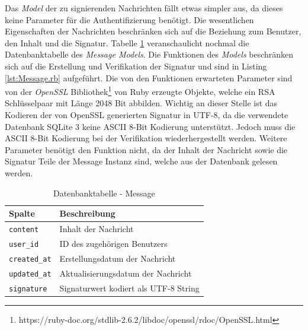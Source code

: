\documentclass[11pt,a4paper,ngerman]{scrreprt}
\begin{document}
Das \textit{Model} der zu signierenden Nachrichten fällt etwas simpler aus, da dieses keine Parameter für die Authentifizierung benötigt. Die wesentlichen Eigenschaften der Nachrichten beschränken sich auf die Beziehung zum Benutzer, den Inhalt und die Signatur. Tabelle \ref{table:db-message} veranschaulicht nochmal die Datenbanktabelle des \textit{Message Models}. Die Funktionen des \textit{Models} beschränken sich auf die Erstellung und Verifikation der Signatur und sind in Listing \ref{lst:Message.rb} aufgeführt. Die von den Funktionen erwarteten Parameter sind von der \textit{OpenSSL} Bibliothek\footnote{https://ruby-doc.org/stdlib-2.6.2/libdoc/openssl/rdoc/OpenSSL.html} von Ruby erzeugte Objekte, welche ein RSA Schlüsselpaar mit Länge 2048 Bit abbilden. Wichtig an dieser Stelle ist das Kodieren der von OpenSSL generierten Signatur in UTF-8, da die verwendete Datenbank SQLite 3 keine ASCII 8-Bit Kodierung unterstützt. Jedoch muss die ASCII 8-Bit Kodierung bei der Verifikation wiederhergestellt werden. Weitere Parameter benötigt den Funktion nicht, da der Inhalt der Nachricht sowie die Signatur Teile der Message Instanz sind, welche aus der Datenbank gelesen werden.
\begin{table}[htbp]
    \begin{tabularx}{\textwidth}{ lX }
        \toprule
        Spalte & Beschreibung \\ 
        \midrule
        \texttt{content} & Inhalt der Nachricht \\
        \texttt{user\_id} & ID des zugehörigen Benutzers \\
        \texttt{created\_at} & Erstellungsdatum der Nachricht \\
        \texttt{updated\_at} & Aktualisierungsdatum der Nachricht \\
        \texttt{signature} & Signaturwert kodiert als UTF-8 String \\
        \bottomrule
    \end{tabularx}
    \caption{Datenbanktabelle - Message}
    \label{table:db-message}
\end{table}
\end{document}
